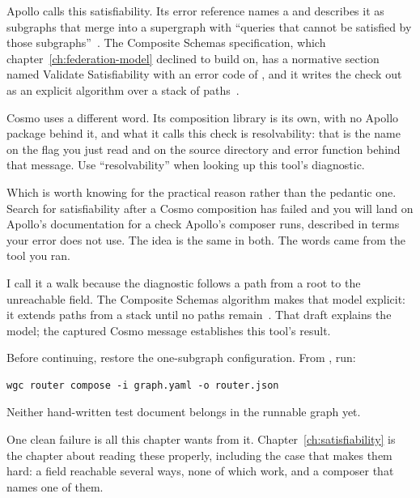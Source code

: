 %
Apollo calls this satisfiability. Its error reference names a
 and describes it as subgraphs that merge into a
supergraph with \enquote{queries that cannot be satisfied by those
subgraphs}~\autocite{apollofederationerrors}. The Composite Schemas
specification, which chapter~\ref{ch:federation-model} declined to build on,
has a normative section named Validate Satisfiability with an error code of
, and it writes the check out as an explicit
algorithm over a stack of paths~\autocite{compositeschemasspec}.

%
Cosmo uses a different word. Its composition library is its own, with no Apollo
package behind it, and what it calls this check is resolvability: that is the
name on the flag you just read and on the source directory and error
function behind that message. Use \enquote{resolvability} when looking up
this tool's diagnostic.

%
Which is worth knowing for the practical reason rather than the pedantic one.
Search for satisfiability after a Cosmo composition has failed and you will
land on Apollo's documentation for a check Apollo's composer runs, described in
terms your error does not use. The idea is the same in both. The words came
from the tool you ran.

%
I call it a walk because the diagnostic follows a path from a root to the
unreachable field. The Composite Schemas algorithm makes that model explicit:
it extends paths from a stack until no paths remain~\autocite{compositeschemasspec}.
That draft explains the model; the captured Cosmo message establishes this
tool's result.

Before continuing, restore the one-subgraph configuration. From
, run:

\begin{verbatim}
wgc router compose -i graph.yaml -o router.json
\end{verbatim}

Neither hand-written test document belongs in the
runnable graph yet.

%
One clean failure is all this chapter wants from it.
Chapter~\ref{ch:satisfiability} is the chapter about reading these properly,
including the case that makes them hard: a field reachable several ways, none
of which work, and a composer that names one of them.
%
